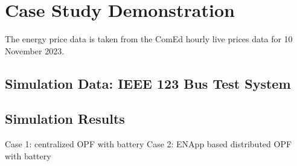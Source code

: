\documentclass{article}
\begin{document}
\section{Case Study Demonstration}
The energy price data is taken from the ComEd hourly live prices data \cite{comedLivePrices} for 10 November 2023. 
\subsection{Simulation Data: IEEE 123 Bus Test System}

\subsection{Simulation Results}
Case 1: centralized OPF with battery
Case 2: ENApp based distributed OPF with battery
\end{document}
